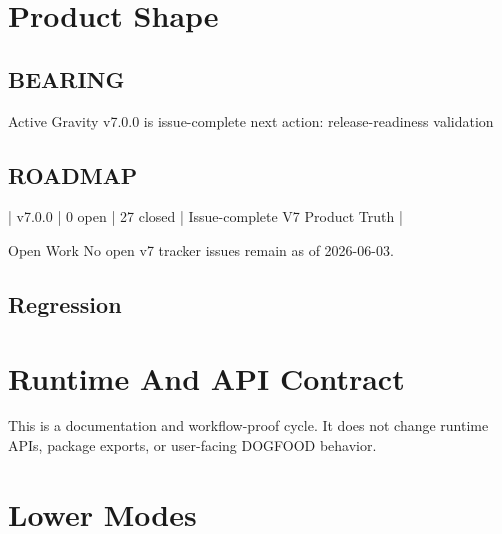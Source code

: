 \section{Product Shape}\label{record-209-product-shape}

\subsection{BEARING}\label{record-209-bearing}

\begin{CodeBlock}
Active Gravity
  v7.0.0 is issue-complete
  next action: release-readiness validation
\end{CodeBlock}

\subsection{ROADMAP}\label{record-209-roadmap}

\begin{CodeBlock}
| v7.0.0 | 0 open | 27 closed | Issue-complete V7 Product Truth |

Open Work
  No open v7 tracker issues remain as of 2026-06-03.
\end{CodeBlock}

\subsection{Regression}\label{record-209-regression}


\section{Runtime And API Contract}\label{record-209-runtime-and-api-contract}

This is a documentation and workflow-proof cycle. It does not change runtime APIs, package exports, or user-facing DOGFOOD behavior.

\section{Lower Modes}\label{record-209-lower-modes}

